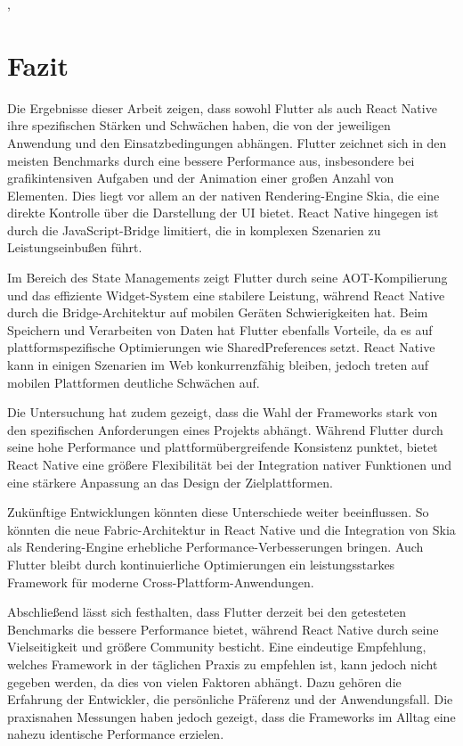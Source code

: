 ,\section{Fazit}
Die Ergebnisse dieser Arbeit zeigen, dass sowohl Flutter als auch React Native ihre spezifischen Stärken und Schwächen haben, die von der jeweiligen Anwendung und den Einsatzbedingungen abhängen. Flutter zeichnet sich in den meisten Benchmarks durch eine bessere Performance aus, insbesondere bei grafikintensiven Aufgaben und der Animation einer großen Anzahl von Elementen. Dies liegt vor allem an der nativen Rendering-Engine Skia, die eine direkte Kontrolle über die Darstellung der UI bietet. React Native hingegen ist durch die JavaScript-Bridge limitiert, die in komplexen Szenarien zu Leistungseinbußen führt.

Im Bereich des State Managements zeigt Flutter durch seine AOT-Kompilierung und das effiziente Widget-System eine stabilere Leistung, während React Native durch die Bridge-Architektur auf mobilen Geräten Schwierigkeiten hat. Beim Speichern und Verarbeiten von Daten hat Flutter ebenfalls Vorteile, da es auf plattformspezifische Optimierungen wie SharedPreferences setzt. React Native kann in einigen Szenarien im Web konkurrenzfähig bleiben, jedoch treten auf mobilen Plattformen deutliche Schwächen auf.

Die Untersuchung hat zudem gezeigt, dass die Wahl der Frameworks stark von den spezifischen Anforderungen eines Projekts abhängt. Während Flutter durch seine hohe Performance und plattformübergreifende Konsistenz punktet, bietet React Native eine größere Flexibilität bei der Integration nativer Funktionen und eine stärkere Anpassung an das Design der Zielplattformen.

Zukünftige Entwicklungen könnten diese Unterschiede weiter beeinflussen. So könnten die neue Fabric-Architektur in React Native und die Integration von Skia als Rendering-Engine erhebliche Performance-Verbesserungen bringen. Auch Flutter bleibt durch kontinuierliche Optimierungen ein leistungsstarkes Framework für moderne Cross-Plattform-Anwendungen.

Abschließend lässt sich festhalten, dass Flutter derzeit bei den getesteten Benchmarks die bessere Performance bietet, während React Native durch seine Vielseitigkeit und größere Community besticht. Eine eindeutige Empfehlung, welches Framework in der täglichen Praxis zu empfehlen ist, kann jedoch nicht gegeben werden, da dies von vielen Faktoren abhängt. Dazu gehören die Erfahrung der Entwickler, die persönliche Präferenz und der Anwendungsfall. Die praxisnahen Messungen haben jedoch gezeigt, dass die Frameworks im Alltag eine nahezu identische Performance erzielen.
